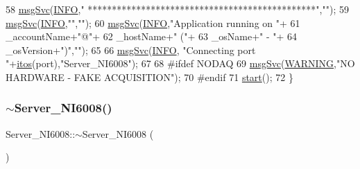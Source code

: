 \begin{DoxyCode}
58   \hyperlink{classServer__NI6008_a140d5f91d6c0f4fb963ecf747e44df78}{msgSvc}(\hyperlink{classServer__NI6008_af1e3e3bac26355a746b5d2e548fe25bea218489470a9743b7d475e86e13ea219d}{INFO},\textcolor{stringliteral}{"                          ***********************************************"},\textcolor{stringliteral}{""});
59   \hyperlink{classServer__NI6008_a140d5f91d6c0f4fb963ecf747e44df78}{msgSvc}(\hyperlink{classServer__NI6008_af1e3e3bac26355a746b5d2e548fe25bea218489470a9743b7d475e86e13ea219d}{INFO},\textcolor{stringliteral}{""},\textcolor{stringliteral}{""});
60   \hyperlink{classServer__NI6008_a140d5f91d6c0f4fb963ecf747e44df78}{msgSvc}(\hyperlink{classServer__NI6008_af1e3e3bac26355a746b5d2e548fe25bea218489470a9743b7d475e86e13ea219d}{INFO},\textcolor{stringliteral}{"Application running on "}+
61          \_accountName+\textcolor{stringliteral}{"@"}+
62          \_hostName+\textcolor{stringliteral}{" ("}+
63          \_osName+\textcolor{stringliteral}{" - "}+
64          \_osVersion+\textcolor{stringliteral}{")"},\textcolor{stringliteral}{""});
65   
66   \hyperlink{classServer__NI6008_a140d5f91d6c0f4fb963ecf747e44df78}{msgSvc}(\hyperlink{classServer__NI6008_af1e3e3bac26355a746b5d2e548fe25bea218489470a9743b7d475e86e13ea219d}{INFO}, \textcolor{stringliteral}{"Connecting port "}+\hyperlink{Tools_8h_af330027dbdafb9a30768b3613c553e60}{itos}(port),\textcolor{stringliteral}{"Server\_NI6008"});
67 
68 \textcolor{preprocessor}{#ifdef NODAQ}
69   \hyperlink{classServer__NI6008_a140d5f91d6c0f4fb963ecf747e44df78}{msgSvc}(\hyperlink{classServer__NI6008_af1e3e3bac26355a746b5d2e548fe25bead7775b9a40b2a58fe2547fe9c2617093}{WARNING},\textcolor{stringliteral}{"NO HARDWARE - FAKE ACQUISITION"});
70 \textcolor{preprocessor}{#endif  }
71   \hyperlink{classServer__NI6008_ae3ac1bbf922a2475f41dfd97482af152}{start}();
72 \}
\end{DoxyCode}
\mbox{\label{classServer__NI6008_a1c9bf761d7bae3ee267363fb851171b7}} 
\subsubsection{\texorpdfstring{$\sim$\+Server\+\_\+\+N\+I6008()}{~Server\_NI6008()}}
{\footnotesize\ttfamily Server\+\_\+\+N\+I6008\+::$\sim$\+Server\+\_\+\+N\+I6008 (\begin{DoxyParamCaption}{ }\end{DoxyParamCaption})\hspace{0.3cm}{\ttfamily [virtual]}}



